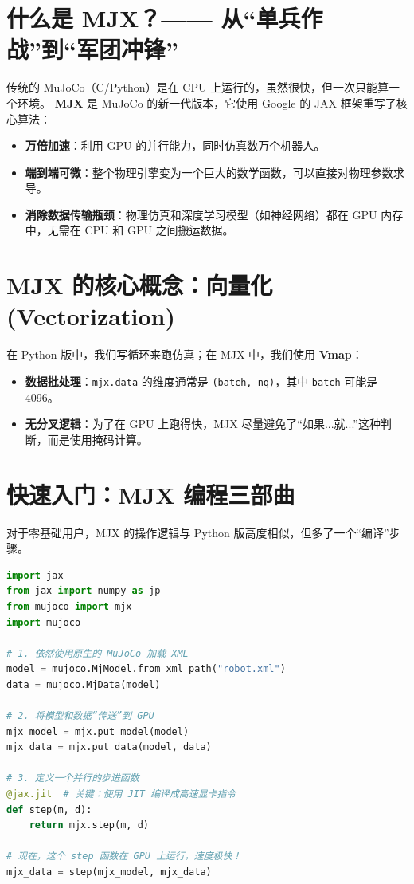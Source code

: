 \documentclass[11pt,a4paper]{book}
\begin{document}
\section{什么是 MJX？—— 从“单兵作战”到“军团冲锋”}
传统的 MuJoCo（C/Python）是在 CPU 上运行的，虽然很快，但一次只能算一个环境。
\textbf{MJX} 是 MuJoCo 的新一代版本，它使用 Google 的 JAX 框架重写了核心算法：
\begin{itemize}
    \item \textbf{万倍加速}：利用 GPU 的并行能力，同时仿真数万个机器人。
    \item \textbf{端到端可微}：整个物理引擎变为一个巨大的数学函数，可以直接对物理参数求导。
    \item \textbf{消除数据传输瓶颈}：物理仿真和深度学习模型（如神经网络）都在 GPU 内存中，无需在 CPU 和 GPU 之间搬运数据。
\end{itemize}

\section{MJX 的核心概念：向量化 (Vectorization)}

在 Python 版中，我们写循环来跑仿真；在 MJX 中，我们使用 \textbf{Vmap}：
\begin{itemize}
    \item \textbf{数据批处理}：\texttt{mjx.data} 的维度通常是 \texttt{(batch, nq)}，其中 \texttt{batch} 可能是 4096。
    \item \textbf{无分叉逻辑}：为了在 GPU 上跑得快，MJX 尽量避免了“如果...就...”这种判断，而是使用掩码计算。
\end{itemize}



\section{快速入门：MJX 编程三部曲}

对于零基础用户，MJX 的操作逻辑与 Python 版高度相似，但多了一个“编译”步骤。

\begin{lstlisting}[language=Python, caption={MJX 基础运行流程}]
import jax
from jax import numpy as jp
from mujoco import mjx
import mujoco

# 1. 依然使用原生的 MuJoCo 加载 XML
model = mujoco.MjModel.from_xml_path("robot.xml")
data = mujoco.MjData(model)

# 2. 将模型和数据“传送”到 GPU
mjx_model = mjx.put_model(model)
mjx_data = mjx.put_data(model, data)

# 3. 定义一个并行的步进函数
@jax.jit  # 关键：使用 JIT 编译成高速显卡指令
def step(m, d):
    return mjx.step(m, d)

# 现在，这个 step 函数在 GPU 上运行，速度极快！
mjx_data = step(mjx_model, mjx_data)
\end{lstlisting}
\end{document}
